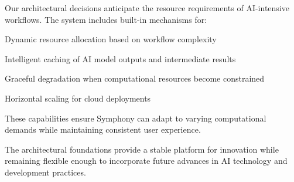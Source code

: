 Our architectural decisions anticipate the resource requirements of AI-intensive workflows. The system includes built-in mechanisms for:

\begin{compactlist}
    \item Dynamic resource allocation based on workflow complexity
    \item Intelligent caching of AI model outputs and intermediate results
    \item Graceful degradation when computational resources become constrained
    \item Horizontal scaling for cloud deployments
\end{compactlist}

These capabilities ensure Symphony can adapt to varying computational demands while maintaining consistent user experience.

\begin{successbox}
The architectural foundations provide a stable platform for innovation while remaining flexible enough to incorporate future advances in AI technology and development practices.
\end{successbox}

